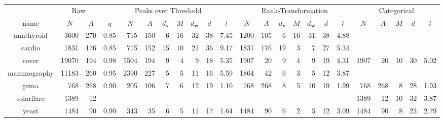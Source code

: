 \begin{tabular}{c|rr|rrrrrrrr|rrrrrrr|rrrrr}
  \toprule
 ~ & \multicolumn{2}{c}{Raw} & \multicolumn{8}{|c}{Peaks over Threshold} & \multicolumn{7}{|c}{Rank-Transformation} & \multicolumn{5}{|c}{Categorical} \\
name & \multicolumn{1}{c}{$N$} & \multicolumn{1}{c|}{$A$} & \multicolumn{1}{c}{$q$} & \multicolumn{1}{c}{$N$} & \multicolumn{1}{c}{$A$} & \multicolumn{1}{c}{$d_{\bm{v}}$} & \multicolumn{1}{c}{$M$} & \multicolumn{1}{c}{$d_{\bm{w}}$} & \multicolumn{1}{c}{$d$} & \multicolumn{1}{c|}{$t$} & \multicolumn{1}{c}{$N$} & \multicolumn{1}{c}{$A$} & \multicolumn{1}{c}{$d_{\bm{v}}$} & \multicolumn{1}{c}{$M$} & \multicolumn{1}{c}{$d_{\bm{w}}$} & \multicolumn{1}{c}{$d$} & \multicolumn{1}{c|}{$t$} & \multicolumn{1}{c}{$N$} & \multicolumn{1}{c}{$A$} & \multicolumn{1}{c}{$M$} & \multicolumn{1}{c}{$d$} & \multicolumn{1}{c}{$t$} \\ \hline
annthyroid  & 3600  & 270 & 0.85 & 715  & 150 &   6 &  16 &  32 &  38 & 7.45 & 1200 & 105 &   6 &  16 &  31 &  38 & 4.88 &      &     &     &     &      \\ 
cardio      & 1831  & 176 & 0.85 & 715  & 152 &  15 &  10 &  21 &  36 & 9.17 & 1831 & 176 &  19 &   3 &   7 &  27 & 5.34 &      &     &     &     &      \\ 
cover       & 19070 & 194 & 0.98 & 5504 & 194 &   9 &   4 &   9 &  18 & 5.35 & 1907 &  20 &   9 &   4 &   9 &  19 & 4.31 & 1907 &  20 &  10 &  30 & 5.02 \\ 
mammography & 11183 & 260 & 0.95 & 2390 & 227 &   5 &   5 &  11 &  16 & 5.59 & 1864 &  42 &   6 &   3 &   5 &  12 & 3.87 &      &     &     &     &      \\ 
pima        & 768   & 268 & 0.90 & 205  & 106 &   7 &   6 &  12 &  19 & 1.10 & 768 & 268  &   8 &   5 &  10 &  19 & 1.99 & 768  & 268 &   8 &  28 & 1.93 \\ 
solarflare  & 1389  & 12  &      &      &     &     &     &     &     &      &     &      &     &     &     &     &      & 1389 &  12 &  10 &  32 & 3.87 \\ 
yeast       & 1484  & 90  & 0.90 & 343  &  35 &   6 &   5 &  11 &  17 & 1.64 & 1484 &  90 &   6 &   2 &   5 &  12 & 3.09 & 1484 &  90 &   8 &  23 & 2.79 \\ 
   \bottomrule
\end{tabular}
